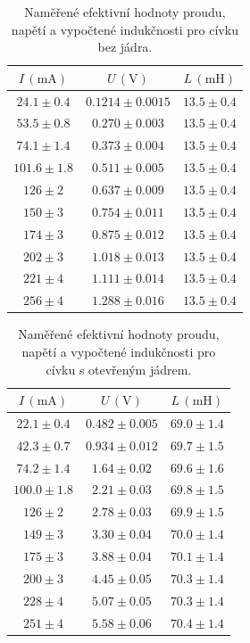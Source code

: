 \documentclass{../concepts/prepareprotokol} %
\begin{document}
\begin{table}[!hp]
\centering
\caption{Naměřené efektivní hodnoty proudu, napětí a vypočtené indukčnosti pro cívku bez jádra.}
\begin{tabular}{ccc}
 \toprule
 $I\, (\mathrm{mA})$ & $U\, (\mathrm{V})$ & $L\, (\mathrm{mH})$ \\
 \midrule
 $24.1 \pm 0.4$ & $0.1214 \pm 0.0015$ & $13.5 \pm 0.4$ \\
 $53.5 \pm 0.8$ & $0.270 \pm 0.003$ & $13.5 \pm 0.4$ \\
 $74.1 \pm 1.4$ & $0.373 \pm 0.004$ & $13.5 \pm 0.4$ \\
 $101.6 \pm 1.8$ & $0.511 \pm 0.005$ & $13.5 \pm 0.4$ \\
 $126 \pm 2$ & $0.637 \pm 0.009$ & $13.5 \pm 0.4$ \\
 $150 \pm 3$ & $0.754 \pm 0.011$ & $13.5 \pm 0.4$ \\
 $174 \pm 3$ & $0.875 \pm 0.012$ & $13.5 \pm 0.4$ \\
 $202 \pm 3$ & $1.018 \pm 0.013$ & $13.5 \pm 0.4$ \\
 $221 \pm 4$ & $1.111 \pm 0.014$ & $13.5 \pm 0.4$ \\
 $256 \pm 4$ & $1.288 \pm 0.016$ & $13.5 \pm 0.4$ \\
 \bottomrule
\end{tabular}
\label{tab:civka1}
\end{table}

\begin{table}[!hp]
\centering
\caption{Naměřené efektivní hodnoty proudu, napětí a vypočtené indukčnosti pro cívku s otevřeným jádrem.}
\begin{tabular}{ccc}
 \toprule
 $I\, (\mathrm{mA})$ & $U\, (\mathrm{V})$ & $L\, (\mathrm{mH})$ \\
 \midrule
 $22.1 \pm 0.4$ & $0.482 \pm 0.005$ & $69.0 \pm 1.4$ \\
 $42.3 \pm 0.7$ & $0.934 \pm 0.012$ & $69.7 \pm 1.5$ \\
 $74.2 \pm 1.4$ & $1.64 \pm 0.02$ & $69.6 \pm 1.6$ \\
 $100.0 \pm 1.8$ & $2.21 \pm 0.03$ & $69.8 \pm 1.5$ \\
 $126 \pm 2$ & $2.78 \pm 0.03$ & $69.9 \pm 1.5$ \\
 $149 \pm 3$ & $3.30 \pm 0.04$ & $70.0 \pm 1.4$ \\
 $175 \pm 3$ & $3.88 \pm 0.04$ & $70.1 \pm 1.4$ \\
 $200 \pm 3$ & $4.45 \pm 0.05$ & $70.3 \pm 1.4$ \\
 $228 \pm 4$ & $5.07 \pm 0.05$ & $70.3 \pm 1.4$ \\
 $251 \pm 4$ & $5.58 \pm 0.06$ & $70.4 \pm 1.4$ \\
 \bottomrule
\end{tabular}
\label{tab:civka2}
\end{table}
\end{document}

